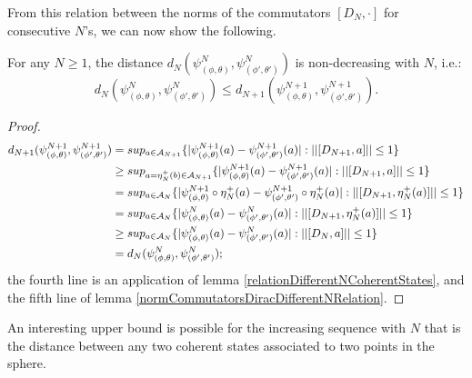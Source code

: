 From this relation between the norms of the commutators $[D_N, \cdot]$ for consecutive $N$'s, we can now show the following.

\begin{theorem}\label{nondecreasingDistanceRelatingNCoherent}
For any $N \geq 1$, the distance $d_N(\psi^N_{(\phi, \theta)}, \psi^N_{(\phi', \theta')})$ is non-decreasing with $N$, i.e.:
\begin{equation}
    d_N(\psi^N_{(\phi, \theta)}, \psi^N_{(\phi', \theta')}) \leq d_{N+1}(\psi^{N+1}_{(\phi, \theta)}, \psi^{N+1}_{(\phi', \theta')}).
\end{equation}
\end{theorem}
\begin{proof}
\begin{align*}
    d_{N+1}(\psi^{N+1}_{(\phi, \theta)}, \psi^{N+1}_{(\phi', \theta')}) 
        &= sup_{a \in \acal_{N+1}} \{|\psi^{N+1}_{(\phi, \theta)}(a) - \psi^{N+1}_{(\phi', \theta')}(a)| : ||[D_{N+1}, a]|| \leq 1\} \\
        &\geq sup_{a = \eta_N^+(b) \in \acal_{N+1}} \{|\psi^{N+1}_{(\phi, \theta)}(a) - \psi^{N+1}_{(\phi', \theta')}(a)| : ||[D_{N+1}, a]|| \leq 1\}\\
        &= sup_{a \in \acal_{N}} \{|\psi^{N+1}_{(\phi, \theta)}\circ \eta_N^+(a) - \psi^{N+1}_{(\phi', \theta')}\circ \eta_N^+(a)| : ||[D_{N+1},  \eta_N^+(a)]|| \leq 1\} \\
        &= sup_{a \in \acal_{N}} \{|\psi^{N}_{(\phi, \theta)}(a) - \psi^{N}_{(\phi', \theta')}(a)| : ||[D_{N+1}, \eta_N^+(a)]|| \leq 1\}\\
        &\geq sup_{a \in \acal_{N}} \{|\psi^{N}_{(\phi, \theta)}(a) - \psi^{N}_{(\phi', \theta')}(a)| : ||[D_{N}, a]|| \leq 1\} \\
        &= d_N(\psi^{N}_{(\phi, \theta)}, \psi^{N}_{(\phi', \theta')});
\end{align*} the fourth line is an application of lemma \ref{relationDifferentNCoherentStates}, and the fifth line of lemma \ref{normCommutatorsDiracDifferentNRelation}.
\end{proof}

\lin

An interesting upper bound is possible for the increasing sequence with $N$ that is the distance between any two coherent states associated to two points in the sphere.

